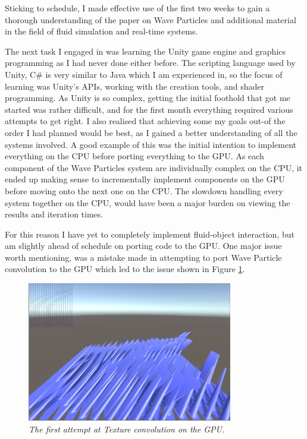 \documentclass[12pt,a4paper,twoside]{report}
\begin{document}
Sticking to schedule, I made effective use of the first two weeks to gain a
thorough understanding of the paper on Wave Particles and additional material in
the field of fluid simulation and real-time systems.

The next task I engaged in was learning the Unity game engine and graphics
programming as I had never done either before. The scripting language used by
Unity, C\# is very similar to Java which I am experienced in, so the focus of
learning was Unity's APIs, working with the creation tools, and shader
programming. As Unity is so complex, getting the initial foothold that got me
started was rather difficult, and for the first month everything required
various attempts to get right. I also realised that achieving some my goals
out-of the order I had planned would be best, as I gained a better understanding
of all the systems involved. A good example of this was the initial intention to
implement everything on the CPU before porting everything to the GPU. As each
component of the Wave Particles system are individually complex on the CPU, it
ended up making sense to incrementally implement components on the GPU before
moving onto the next one on the CPU. The slowdown handling every system together
on the CPU, would have been a major burden on viewing the results and iteration
times.

For this reason I have yet to completely implement fluid-object interaction, but
am slightly ahead of schedule on porting code to the GPU. One major issue worth
mentioning, was a mistake made in attempting to port Wave Particle convolution
to the GPU which led to the issue shown in Figure \ref{fig:fail}.

\begin{figure}[h]
\centering
\includegraphics[width=0.8\textwidth]{texture_copy_issues}
\caption{\textit{The first attempt at Texture convolution on the GPU.}}
\label{fig:fail}
\end{figure}
\end{document}
